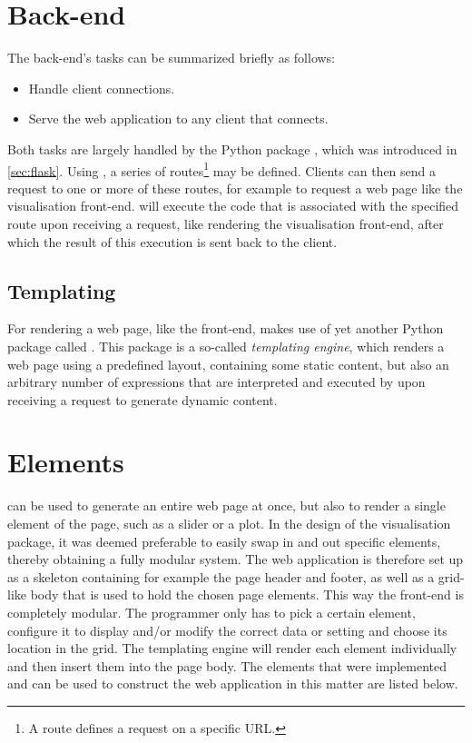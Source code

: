 \documentclass[a4paper, openany, oneside]{memoir}
\begin{document}
\section{Back-end}
\label{sec:webserver}
The back-end's tasks can be summarized briefly as follows:

\begin{itemize}
	\item Handle client connections.
	\item Serve the web application to any client that connects.
\end{itemize}

Both tasks are largely handled by the Python package , which was introduced in \cref{sec:flask}. Using , a series of routes\footnote{A route defines a request on a specific URL.} may be defined. Clients can then send a request to one or more of these routes, for example to request a web page like the visualisation front-end.  will execute the code that is associated with the specified route upon receiving a request, like rendering the visualisation front-end, after which the result of this execution is sent back to the client.

\subsection{Templating}
\label{sec:templating}
For rendering a web page, like the front-end,  makes use of yet another Python package called . This package is a so-called \emph{templating engine}, which renders a web page using a predefined layout, containing some static content, but also an arbitrary number of expressions that are interpreted and executed by  upon receiving a request to generate dynamic content.

\section{Elements}
\label{sec:elements}
 can be used to generate an entire web page at once, but also to render a single element of the page, such as a slider or a plot. In the design of the visualisation package, it was deemed preferable to easily swap in and out specific elements, thereby obtaining a fully modular system. The web application is therefore set up as a skeleton containing for example the page header and footer, as well as a grid-like body that is used to hold the chosen page elements. This way the front-end is completely modular. The programmer only has to pick a certain element, configure it to display and/or modify the correct data or setting and choose its location in the grid. The templating engine will render each element individually and then insert them into the page body. The elements that were implemented and can be used to construct the web application in this matter are listed below.
\end{document}
